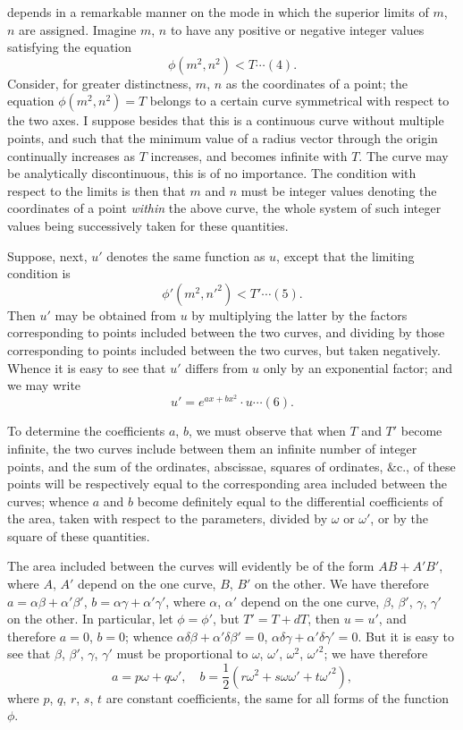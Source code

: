 \documentclass[12pt,a4paper]{article}
\begin{document}
\newpage
\setcounter{page}{138}

depends in a remarkable manner on the mode in which the superior limits of $m$, $n$
are assigned. Imagine $m$, $n$ to have any positive or negative integer values satisfying the
equation
\[
\phi(m^2, n^2) < T \cdots (4).
\]
Consider, for greater distinctness, $m$, $n$ as the coordinates of a point; the equation
$\phi(m^2, n^2) = T$ belongs to a certain curve symmetrical with respect to the two axes.
I suppose besides that this is a continuous curve without multiple points, and such
that the minimum value of a radius vector through the origin continually increases as
$T$ increases, and becomes infinite with $T$. The curve may be analytically discontinuous,
this is of no importance. The condition with respect to the limits is then that $m$
and $n$ must be integer values denoting the coordinates of a point \textit{within} the above
curve, the whole system of such integer values being successively taken for these
quantities.

Suppose, next, $u'$ denotes the same function as $u$, except that the limiting condition is
\[
\phi'(m^2, n'^2) < T' \cdots (5).
\]
Then $u'$ may be obtained from $u$ by multiplying the latter by the factors corresponding
to points included between the two curves, and dividing by those corresponding to
points included between the two curves, but taken negatively. Whence it is easy to
see that $u'$ differs from $u$ only by an exponential factor; and we may write
\[
u' = e^{ax + bx^2} \cdot u \cdots (6).\]

\newpage
\setcounter{page}{139}

To determine the coefficients $a$, $b$, we must observe that when $T$ and $T'$ become
infinite, the two curves include between them an infinite number of integer points, and
the sum of the ordinates, abscissae, squares of ordinates, \&c., of these points will be
respectively equal to the corresponding area included between the curves; whence $a$
and $b$ become definitely equal to the differential coefficients of the area, taken with
respect to the parameters, divided by $\omega$ or $\omega'$, or by the square of these quantities.

The area included between the curves will evidently be of the form $AB + A'B'$,
where $A$, $A'$ depend on the one curve, $B$, $B'$ on the other. We have therefore
$a = \alpha\beta + \alpha'\beta'$, $b = \alpha\gamma + \alpha'\gamma'$, where $\alpha$, $\alpha'$ depend on the one curve, $\beta$, $\beta'$, $\gamma$, $\gamma'$
on the other. In particular, let $\phi = \phi'$, but $T' = T + dT$, then $u = u'$, and therefore
$a = 0$, $b = 0$; whence $\alpha\delta\beta + \alpha'\delta\beta' = 0$, $\alpha\delta\gamma + \alpha'\delta\gamma' = 0$. But it is easy to see that
$\beta$, $\beta'$, $\gamma$, $\gamma'$ must be proportional to $\omega$, $\omega'$, $\omega^2$, $\omega'^2$; we have therefore
\[
a = p\omega + q\omega',\quad b = \frac{1}{2}(r\omega^2 + s\omega\omega' + t\omega'^2),
\]
where $p$, $q$, $r$, $s$, $t$ are constant coefficients, the same for all forms of the function $\phi$.
\end{document}
